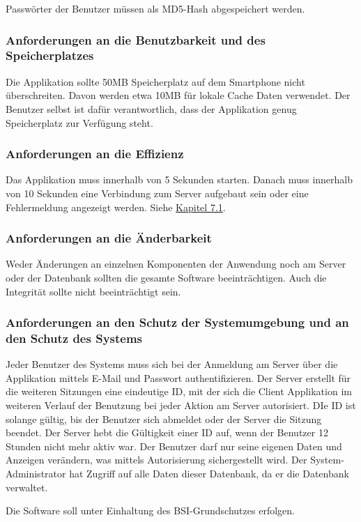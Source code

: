 \documentclass[a4paper,12pt,oneside]{scrartcl}
\begin{document}
Passwörter der Benutzer müssen als MD5-Hash abgespeichert werden.


\subsubsection{Anforderungen an die Benutzbarkeit und des Speicherplatzes}
Die Applikation sollte 50MB Speicherplatz auf dem Smartphone nicht überschreiten. 
Davon werden etwa 10MB für lokale Cache Daten verwendet.
Der Benutzer selbst ist dafür verantwortlich, dass der Applikation genug Speicherplatz zur Verfügung steht. 


\subsubsection{Anforderungen an die Effizienz}
Das Applikation muss innerhalb von 5 Sekunden starten.
Danach muss innerhalb von 10 Sekunden eine Verbindung zum Server aufgebaut sein oder eine Fehlermeldung angezeigt werden.
Siehe \hyperlink{s07}{Kapitel 7.1}.


\subsubsection{Anforderungen an die Änderbarkeit}
Weder Änderungen an einzelnen Komponenten der Anwendung noch am Server oder der Datenbank sollten die gesamte Software beeinträchtigen.
Auch die Integrität sollte nicht beeinträchtigt sein.


\subsubsection{Anforderungen an den Schutz der Systemumgebung und an den Schutz des Systems}
Jeder Benutzer des Systems muss sich bei der Anmeldung am Server über die Applikation mittels E-Mail und Passwort authentifizieren.
Der Server erstellt für die weiteren Sitzungen eine eindeutige ID, mit der sich die Client Applikation im weiteren Verlauf der Benutzung bei jeder Aktion am Server autorisiert.
DIe ID ist solange gültig, bis der Benutzer sich abmeldet oder der Server die Sitzung beendet.
Der Server hebt die Gültigkeit einer ID auf, wenn der Benutzer 12 Stunden nicht mehr aktiv war.
Der Benutzer darf nur seine eigenen Daten und Anzeigen verändern, was mittels Autorisierung sichergestellt wird.
Der System-Administrator hat Zugriff auf alle Daten dieser Datenbank, da er die Datenbank verwaltet. 

Die Software soll unter Einhaltung des BSI-Grundschutzes erfolgen. 
\end{document}
